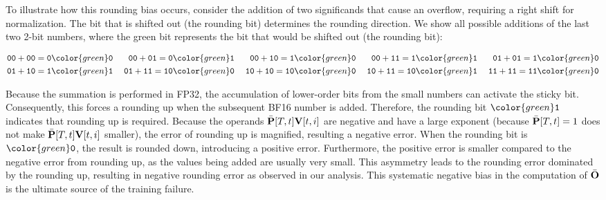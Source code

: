 \documentclass{article} %
\begin{document}
To illustrate how this rounding bias occurs, consider the addition of two significands that cause an overflow, requiring a right shift for normalization. The bit that is shifted out (the rounding bit) determines the rounding direction. We show all possible additions of the last two 2-bit numbers, where the green bit represents the bit that would be shifted out (the rounding bit):
\begin{tcolorbox}[colback=black!5!white,      
  colframe=black,             
  boxrule=0.5pt,             
  width=0.95\linewidth,       
  arc=4pt,                     
  boxsep=1pt,                  
  halign=center,              
  top=0pt,
  bottom=0.5pt,
  center
]
\vspace{-5px}
\begin{align*}
  \mathtt{00}+\mathtt{00}=\mathtt{0}&{\color{green}\mathtt{0}} &\; \mathtt{00} + \mathtt{01} = \mathtt{0}&{\color{green}\mathtt{1}}& \; \mathtt{00} + \mathtt{10} = \mathtt{1}&{\color{green}\mathtt{0}} &\; \mathtt{00} + \mathtt{11} = \mathtt{1}&{\color{green}\mathtt{1}} &\; \mathtt{01} + \mathtt{01} = \mathtt{1}&{\color{green}\mathtt{0}} \\
  \mathtt{01} + \mathtt{10} = \mathtt{1}&{\color{green}\mathtt{1}} &\; \mathtt{01} + \mathtt{11} = \mathtt{10}&{\color{green}\mathtt{0}}& \; \mathtt{10}+\mathtt{10}=\mathtt{10}&{\color{green}\mathtt{0}} &\; \mathtt{10} + \mathtt{11} = \mathtt{10}&{\color{green}\mathtt{1}} &\; \mathtt{11} + \mathtt{11} = \mathtt{11}&{\color{green}\mathtt{0}}
\end{align*}
\end{tcolorbox}
Because the summation is performed in FP32, the accumulation of lower-order bits from the small numbers can activate the sticky bit. Consequently, this forces a rounding up when the subsequent BF16 number is added. Therefore, the rounding bit ${\color{green}\mathtt{1}}$ indicates that rounding up is required. Because the operands $\bar{{\mathbf{P}}}[T, t]{\mathbf{V}}[t, i]$ are negative and have a large exponent (because $\bar{{\mathbf{P}}}[T, t]=1$ does not make $\bar{{\mathbf{P}}}[T, t]{\mathbf{V}}[t, i]$ smaller), the error of rounding up is magnified, resulting a negative error. When the rounding bit is ${\color{green}\mathtt{0}}$, the result is rounded down, introducing a positive error.
Furthermore, the positive error is smaller compared to the negative error from rounding up, as the values being added are usually very small. This asymmetry leads to the rounding error dominated by the rounding up, resulting in negative rounding error as observed in our analysis. This systematic negative bias in the computation of $\bar{{\mathbf{O}}}$ is the ultimate source of the training failure.
\end{document}
